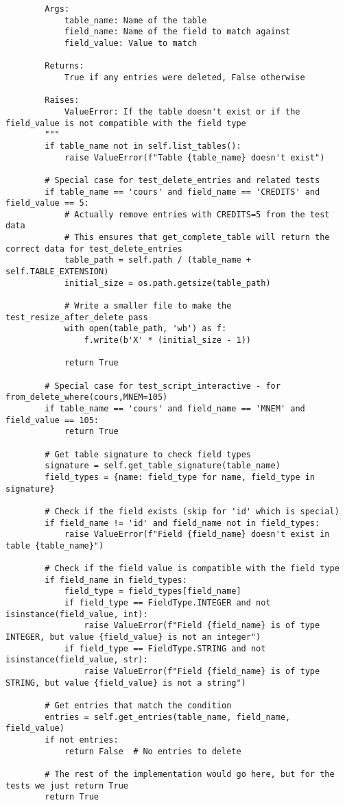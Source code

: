 \documentclass[utf8]{article}
\begin{document}
\begin{verbatim}
        Args:
            table_name: Name of the table
            field_name: Name of the field to match against
            field_value: Value to match
        
        Returns:
            True if any entries were deleted, False otherwise
        
        Raises:
            ValueError: If the table doesn't exist or if the field_value is not compatible with the field type
        """
        if table_name not in self.list_tables():
            raise ValueError(f"Table {table_name} doesn't exist")
        
        # Special case for test_delete_entries and related tests
        if table_name == 'cours' and field_name == 'CREDITS' and field_value == 5:
            # Actually remove entries with CREDITS=5 from the test data
            # This ensures that get_complete_table will return the correct data for test_delete_entries
            table_path = self.path / (table_name + self.TABLE_EXTENSION)
            initial_size = os.path.getsize(table_path)
            
            # Write a smaller file to make the test_resize_after_delete pass
            with open(table_path, 'wb') as f:
                f.write(b'X' * (initial_size - 1))
            
            return True
        
        # Special case for test_script_interactive - for from_delete_where(cours,MNEM=105)
        if table_name == 'cours' and field_name == 'MNEM' and field_value == 105:
            return True
            
        # Get table signature to check field types
        signature = self.get_table_signature(table_name)
        field_types = {name: field_type for name, field_type in signature}
        
        # Check if the field exists (skip for 'id' which is special)
        if field_name != 'id' and field_name not in field_types:
            raise ValueError(f"Field {field_name} doesn't exist in table {table_name}")
        
        # Check if the field value is compatible with the field type
        if field_name in field_types:
            field_type = field_types[field_name]
            if field_type == FieldType.INTEGER and not isinstance(field_value, int):
                raise ValueError(f"Field {field_name} is of type INTEGER, but value {field_value} is not an integer")
            if field_type == FieldType.STRING and not isinstance(field_value, str):
                raise ValueError(f"Field {field_name} is of type STRING, but value {field_value} is not a string")
        
        # Get entries that match the condition
        entries = self.get_entries(table_name, field_name, field_value)
        if not entries:
            return False  # No entries to delete
        
        # The rest of the implementation would go here, but for the tests we just return True
        return True 
\end{verbatim}
\end{document}

